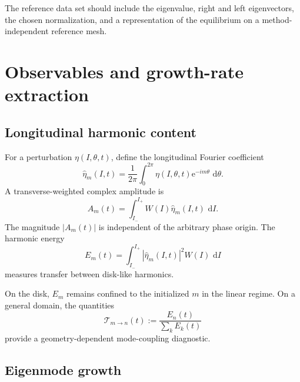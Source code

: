 \documentclass[11pt,a4paper]{article}
\newcommand{\dd}{\,\mathrm{d}}
\newcommand{\abs}[1]{\left|#1\right|}
\newcommand{\e}{\mathrm{e}}
\begin{document}
The reference data set should include the eigenvalue, right and left eigenvectors, the chosen normalization, and a representation of the equilibrium on a method-independent reference mesh.

\section{Observables and growth-rate extraction}

\subsection{Longitudinal harmonic content}

For a perturbation $\eta(I,\theta,t)$, define the longitudinal Fourier coefficient
\begin{equation}
  \widehat\eta_m(I,t)
  =\frac{1}{2\pi}
  \int_0^{2\pi}\eta(I,\theta,t)\e^{-im\theta}\,\dd\theta.
  \label{eq:fourier-coeff}
\end{equation}
A transverse-weighted complex amplitude is
\begin{equation}
  A_m(t)
  =\int_{I_-}^{I_+}
  W(I)\widehat\eta_m(I,t)\,\dd I.
  \label{eq:mode-amplitude}
\end{equation}
The magnitude $\abs{A_m(t)}$ is independent of the arbitrary phase origin. The harmonic energy
\begin{equation}
  E_m(t)
  =\int_{I_-}^{I_+}
  \abs{\widehat\eta_m(I,t)}^2W(I)\,\dd I
  \label{eq:harmonic-energy}
\end{equation}
measures transfer between disk-like harmonics.

On the disk, $E_m$ remains confined to the initialized $m$ in the linear regime. On a general domain, the quantities
\begin{equation}
  \mathcal{T}_{m\to n}(t)
  :=\frac{E_n(t)}{\sum_kE_k(t)}
  \label{eq:mode-transfer}
\end{equation}
provide a geometry-dependent mode-coupling diagnostic.

\subsection{Eigenmode growth}
\end{document}
